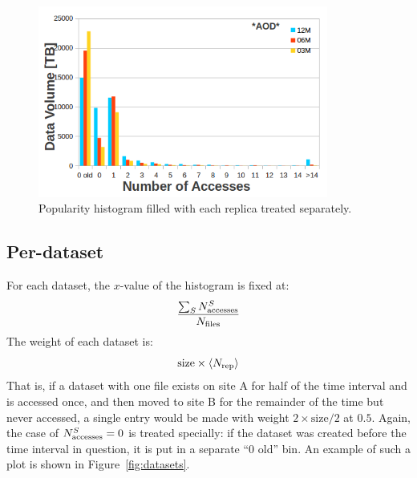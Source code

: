 \begin{figure}[htpb]
  \begin{center}
    \includegraphics[width=0.85\textwidth]{plots/per_replica.png}
  \end{center}
  \caption{Popularity histogram filled with each replica treated separately.}  
  \label{fig:replicas}
\end{figure}


\subsection{Per-dataset}

For each dataset, the $x$-value of the histogram is fixed at:
%
\begin{equation}
  \frac{\sum_SN_\text{accesses}^S}{N_\mathrm{files}}
\end{equation}
%
The weight of each dataset is:
\begin{equation}
  \mathrm{size} \times \langle N_\text{rep}\rangle
\end{equation}
That is, if a dataset with one file exists on site A for half of the time interval 
and is accessed once, and then moved to site B for the remainder of the time but 
never accessed, a single entry would be made with weight $2\times\mathrm{size}/2$ 
at $0.5$. Again, the case of $N_\text{accesses}^S=0$ is treated specially: if the dataset
was created before the time interval in question, it is put in a separate
``0 old'' bin.
An example of such a plot is shown in Figure~\ref{fig:datasets}.

